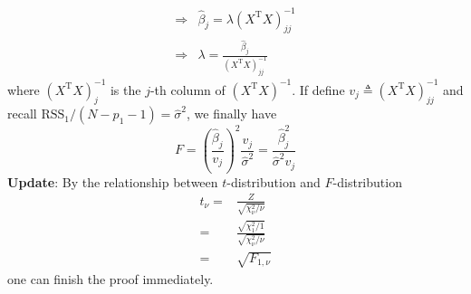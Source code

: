 \begin{sol}
\begin{align*}
\Longrightarrow & \hat{\beta}_j = \lambda (X^\mathrm{T}X)^{-1}_{jj} \\
\Longrightarrow & \lambda = \frac{\hat{\beta}_j}{(X^\mathrm{T}X)^{-1}_{jj}}
\end{align*}
where $(X^\mathrm{T}X)^{-1}_j$ is the $j$-th column of $(X^\mathrm{T}X)^{-1}$. If define $v_j\triangleq(X^\mathrm{T}X)^{-1}_{jj}$ and recall $\mathrm{RSS}_1/(N-p_1-1)=\hat{\sigma}^2$, we finally have
\[
F = \left(\frac{\hat{\beta}_j}{v_j}\right)^2 \frac{v_j}{\hat{\sigma}^2} = \frac{\hat{\beta}_j^2}{\hat{\sigma}^2v_j}
\]
\textbf{Update}: By the relationship between $t$-distribution and $F$-distribution
\begin{align*}
t_\nu=& \frac{Z}{\sqrt{\chi_\nu^2/\nu}}\\
=& \frac{\sqrt{\chi_1^2/1}}{\sqrt{\chi_\nu^2/\nu}}\\
=& \sqrt{F_{1,\nu}}
\end{align*}
one can finish the proof immediately.
\end{sol}

